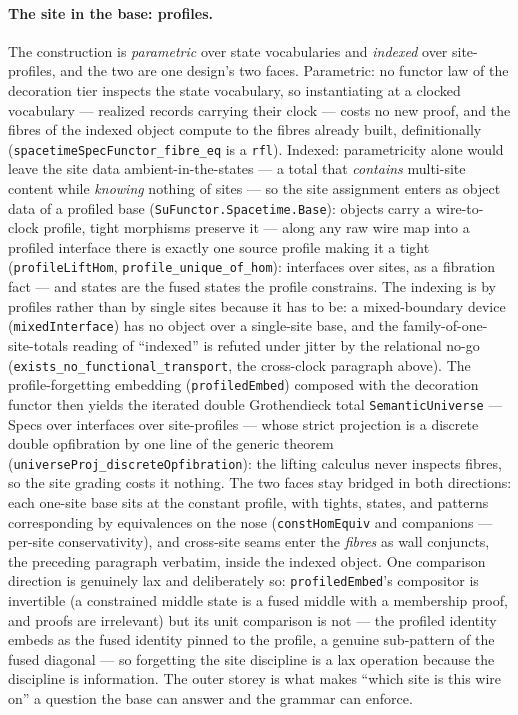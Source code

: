 \paragraph{The site in the base: profiles.} The construction is
\emph{parametric} over state vocabularies and \emph{indexed} over
site-profiles, and the two are one design's two faces.
Parametric: no functor law of the decoration tier inspects the
state vocabulary, so instantiating at a clocked vocabulary ---
realized records carrying their clock --- costs no new proof, and
the fibres of the indexed object compute to the fibres already
built, definitionally
(\texttt{spacetimeSpecFunctor\_fibre\_eq} is a \texttt{rfl}).
Indexed: parametricity alone would leave the site data
ambient-in-the-states --- a total that \emph{contains} multi-site
content while \emph{knowing} nothing of sites --- so the site
assignment enters as object data of a profiled base
(\texttt{SuFunctor.Spacetime.Base}): objects carry a wire-to-clock
profile, tight morphisms preserve it --- along any raw wire map into a
profiled interface there is exactly one source profile making it a
tight (\texttt{profileLiftHom}, \texttt{profile\_unique\_of\_hom}):
interfaces over sites, as a fibration fact --- and states are the
fused states the profile constrains. The indexing is by profiles
rather than by single sites because it has to be: a mixed-boundary
device (\texttt{mixedInterface}) has no object over a single-site
base, and the family-of-one-site-totals reading of ``indexed'' is
refuted under jitter by the relational no-go
(\texttt{exists\_no\_functional\_transport}, the cross-clock
paragraph above). The profile-forgetting embedding
(\texttt{profiledEmbed}) composed with the decoration functor then
yields the iterated double Grothendieck total
\texttt{SemanticUniverse} --- Specs over interfaces over
site-profiles --- whose strict projection is a discrete double
opfibration by one line of the generic theorem
(\texttt{universeProj\_discreteOpfibration}): the lifting
calculus never inspects fibres, so the site grading costs it
nothing. The two faces stay bridged in both directions: each
one-site base sits at the constant profile, with tights, states,
and patterns corresponding by equivalences on the nose
(\texttt{constHomEquiv} and companions --- per-site
conservativity), and cross-site seams enter the \emph{fibres} as
wall conjuncts, the preceding paragraph verbatim, inside the
indexed object. One comparison direction is genuinely lax and
deliberately so: \texttt{profiledEmbed}'s compositor is invertible
(a constrained middle state is a fused middle with a membership
proof, and proofs are irrelevant) but its unit comparison is not
--- the profiled identity embeds as the fused identity pinned to
the profile, a genuine sub-pattern of the fused diagonal --- so
forgetting the site discipline is a lax operation because the
discipline is information. The outer storey is what makes ``which
site is this wire on'' a question the base can answer and the
grammar can enforce.

